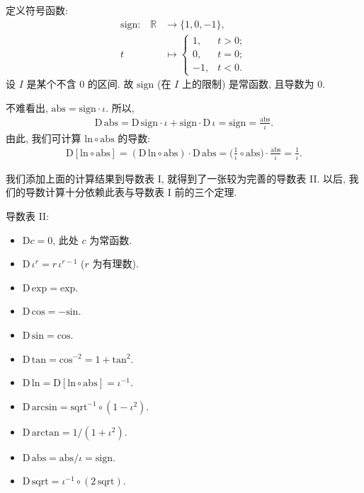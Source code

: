\begin{example}
    定义符号函数:
    \begin{align*}
        \text{$\mathrm{sign}$:} \quad
        \mathbb{R} & \to \{ 1, 0, -1 \},  \\
        t          & \mapsto \begin{cases}
                                 1,  & t > 0; \\
                                 0,  & t = 0; \\
                                 -1, & t < 0.
                             \end{cases}
    \end{align*}
    设 $I$ 是某个不含 $0$ 的区间. 故 $\mathrm{sign}$ (在 $I$ 上的限制) 是常函数, 且导数为 $0$.

    不难看出, $\mathrm{abs} = \mathrm{sign} \cdot \iota$. 所以,
    \begin{align*}
        \mathrm{D}\, \mathrm{abs} = {\mathrm{D}\, \mathrm{sign}} \cdot \iota + \mathrm{sign} \cdot {\mathrm{D}\, \iota} = \mathrm{sign} = \frac{\mathrm{abs}}{\iota}.
    \end{align*}
    由此, 我们可计算 $\mathrm{ln} \circ \mathrm{abs}$ 的导数:
    \begin{align*}
        \mathrm{D} [\mathrm{ln} \circ \mathrm{abs}] = (\mathrm{D}\, \mathrm{ln} \circ \mathrm{abs}) \cdot \mathrm{D}\, \mathrm{abs} = \bigg(\frac{1}{\iota} \circ \mathrm{abs} \bigg) \cdot \frac{\mathrm{abs}}{\iota} = \frac{1}{\iota}.
    \end{align*}
\end{example}

我们添加上面的计算结果到导数表 I, 就得到了一张较为完善的导数表 II. 以后, 我们的导数计算十分依赖此表与导数表 I 前的三个定理.

\begin{theorem}
    导数表 II:
    \begin{itemize}
        \item $\mathrm{D} c = 0$, 此处 $c$ 为常函数.
        \item $\mathrm{D}\, \iota^r = r \, \iota^{r - 1}$ ($r$ 为有理数).
        \item $\mathrm{D}\, \mathrm{exp} = \mathrm{exp}$.
        \item $\mathrm{D}\, \mathrm{cos} = -\mathrm{sin}$.
        \item $\mathrm{D}\, \mathrm{sin} = \mathrm{cos}$.
        \item $\mathrm{D}\, \mathrm{tan} = \mathrm{cos}^{-2} = 1 + \mathrm{tan}^2$.
        \item $\mathrm{D}\, \mathrm{ln} = \mathrm{D} [\mathrm{ln} \circ \mathrm{abs}] = \iota^{-1}$.
        \item $\mathrm{D}\, \mathrm{arcsin} = \mathrm{sqrt}^{-1} \circ (1 - \iota^2)$.
        \item $\mathrm{D}\, \mathrm{arctan} = 1/(1 + \iota^2)$.
        \item $\mathrm{D}\, \mathrm{abs} = \mathrm{abs}/\iota = \mathrm{sign}$.
        \item $\mathrm{D}\, \mathrm{sqrt} = \iota^{-1} \circ (2\,\mathrm{sqrt})$.
    \end{itemize}
\end{theorem}
